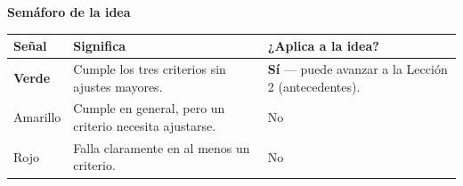 \documentclass[12pt,letterpaper]{article}
\begin{document}
\bigskip
\noindent\textbf{Semáforo de la idea}
\begin{center}
\begin{tabularx}{\textwidth}{L{2.5cm} L{6cm} X}
\toprule
\textbf{Señal} & \textbf{Significa} & \textbf{¿Aplica a la idea?}\\
\midrule
\textcolor{greensignal}{\textbf{Verde}} & Cumple los tres criterios sin ajustes mayores. & \textbf{Sí} --- puede avanzar a la Lección 2 (antecedentes).\\
Amarillo & Cumple en general, pero un criterio necesita ajustarse. & No\\
Rojo & Falla claramente en al menos un criterio. & No\\
\bottomrule
\end{tabularx}
\end{center}
\end{document}
